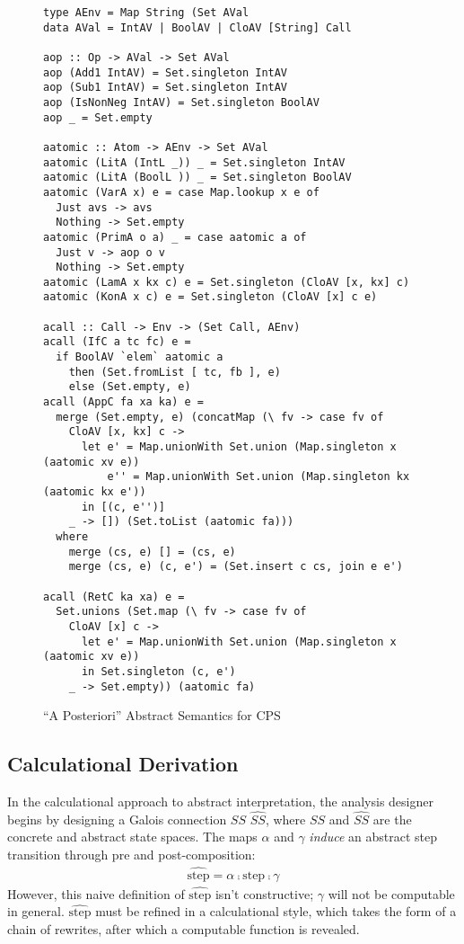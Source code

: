 \documentclass{article}
\begin{document}
\begin{figure}
\begin{lstlisting}[basicstyle=\tiny]
type AEnv = Map String (Set AVal
data AVal = IntAV | BoolAV | CloAV [String] Call

aop :: Op -> AVal -> Set AVal
aop (Add1 IntAV) = Set.singleton IntAV
aop (Sub1 IntAV) = Set.singleton IntAV
aop (IsNonNeg IntAV) = Set.singleton BoolAV
aop _ = Set.empty

aatomic :: Atom -> AEnv -> Set AVal
aatomic (LitA (IntL _)) _ = Set.singleton IntAV
aatomic (LitA (BoolL )) _ = Set.singleton BoolAV
aatomic (VarA x) e = case Map.lookup x e of
  Just avs -> avs
  Nothing -> Set.empty
aatomic (PrimA o a) _ = case aatomic a of
  Just v -> aop o v
  Nothing -> Set.empty
aatomic (LamA x kx c) e = Set.singleton (CloAV [x, kx] c)
aatomic (KonA x c) e = Set.singleton (CloAV [x] c e)

acall :: Call -> Env -> (Set Call, AEnv)
acall (IfC a tc fc) e = 
  if BoolAV `elem` aatomic a
    then (Set.fromList [ tc, fb ], e)
    else (Set.empty, e)
acall (AppC fa xa ka) e =
  merge (Set.empty, e) (concatMap (\ fv -> case fv of
    CloAV [x, kx] c -> 
      let e' = Map.unionWith Set.union (Map.singleton x (aatomic xv e))
          e'' = Map.unionWith Set.union (Map.singleton kx (aatomic kx e'))
      in [(c, e'')]
    _ -> []) (Set.toList (aatomic fa)))
  where
    merge (cs, e) [] = (cs, e)
    merge (cs, e) (c, e') = (Set.insert c cs, join e e')
    
acall (RetC ka xa) e =
  Set.unions (Set.map (\ fv -> case fv of
    CloAV [x] c -> 
      let e' = Map.unionWith Set.union (Map.singleton x (aatomic xv e))
      in Set.singleton (c, e')
    _ -> Set.empty)) (aatomic fa)
\end{lstlisting}
\caption{``A Posteriori'' Abstract Semantics for CPS}
\label{cps:abstract}
\end{figure}

\subsection{Calculational Derivation}

In the calculational approach to abstract interpretation, the analysis designer
begins by designing a Galois connection $SS$ \galois{\alpha}{\gamma}
$\widehat{SS}$, where $SS$ and $\widehat{SS}$ are the concrete and abstract
state spaces.
%
The maps $\alpha$ and $\gamma$ \textit{induce} an abstract step transition
through pre and post-composition:
%
\begin{align*}
\widehat{\text{step}} = \alpha \comp \text{step} \comp \gamma
\end{align*}
%
However, this naive definition of $\widehat{\text{step}}$ isn't constructive;
$\gamma$ will not be computable in general.
%
$\widehat{\text{step}}$ must be refined in a calculational style, which takes
the form of a chain of rewrites, after which a computable function is revealed.
\end{document}
